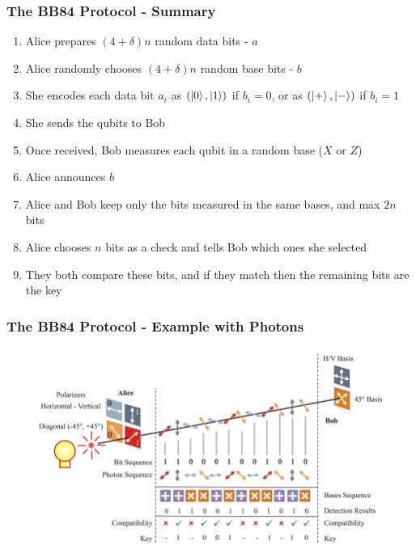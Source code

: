 \documentclass{beamer}
\begin{document}
  \begin{frame}
    \frametitle{The BB84 Protocol - Summary}
    \begin{enumerate}
      \item Alice prepares $(4 + \delta)n$ random data bits - $a$
      \item Alice randomly chooses $(4 + \delta)n$ random base bits - $b$
      \item She encodes each data bit $a_i$ as $(\ket0, \ket1)$ if $b_i = 0$, or as $(\ket+, \ket-)$ if $b_i = 1$
      \item She sends the qubits to Bob
      \item Once received, Bob measures each qubit in a random base ($X$ or $Z$)
      \item Alice announces $b$
      \item Alice and Bob keep only the bits measured in the same bases, and max $2n$ bits
      \item Alice chooses $n$ bits as a check and tells Bob which ones she selected
      \item They both compare these bits, and if they match then the remaining bits are the key
    \end{enumerate}  
  \end{frame}

  \begin{frame}
    \frametitle{The BB84 Protocol - Example with Photons}
    \begin{figure}[H]
      \centering
      \includegraphics[width=0.9\linewidth]{bb84-photons.jpeg}
    \end{figure}
  \end{frame}
\end{document}
